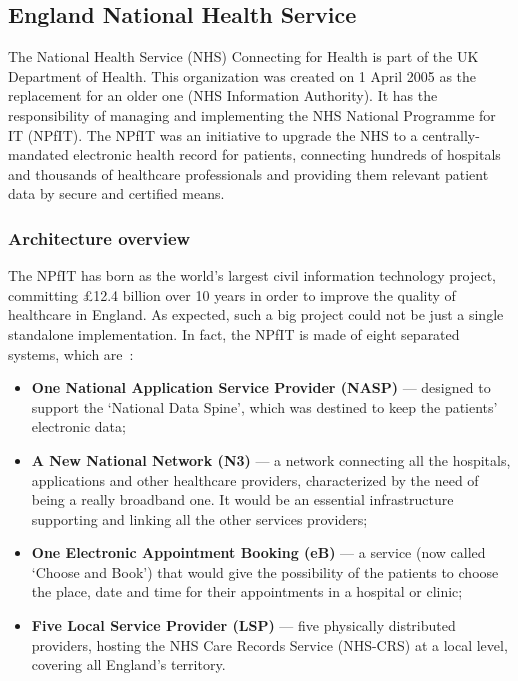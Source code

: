 \subsection{England National Health Service}

The National Health Service (NHS) Connecting for Health is part of the UK Department of Health. This organization was created on 1 April 2005 as the replacement for an older one (NHS Information Authority). It has the responsibility of managing and implementing the NHS National Programme for IT (NPfIT). The NPfIT was an initiative to upgrade the NHS to a centrally-mandated electronic health record  for patients, connecting hundreds of hospitals and thousands of healthcare professionals and providing them relevant patient data by secure and certified means.


\subsubsection{Architecture overview}

The NPfIT has born as the world's largest civil information technology project, committing £12.4 billion over 10 years in order to improve the quality of healthcare in England. As expected, such a big project could not be just a single standalone implementation. In fact, the NPfIT is made of eight separated systems, which are~\citep{Brennan2005}: 
\begin{itemize}
\item \textbf{One National Application Service Provider (NASP)} --- designed to support the `National Data Spine', which was destined to keep the patients' electronic data;
\item \textbf{A New National Network (N3)} --- a network connecting all the hospitals, applications and other healthcare providers, characterized by the need of being a really broadband one. It would be an essential infrastructure supporting and linking all the other services providers;
\item \textbf{One Electronic Appointment Booking (eB)} --- a service (now called `Choose and Book') that would give the possibility of the patients to choose the place, date and time for their appointments in a hospital or clinic;
\item \textbf{Five Local Service Provider (LSP)} --- five physically distributed providers, hosting the NHS Care Records Service (NHS-CRS) at a local level, covering all England's territory.
\end{itemize}

